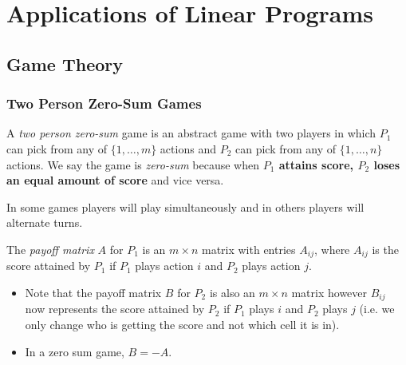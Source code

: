 \documentclass[../main.tex]{subfiles}
\begin{document}
\chapter{Applications of Linear Programs}
\section{Game Theory}
\subsection{Two Person Zero-Sum Games}
\begin{definition}
  A \textit{two person zero-sum} game is an abstract game with two players in which $P_1$ can pick from any of $\{1, \ldots, m\}$ actions and $P_2$ can pick from any of $\{1, \ldots, n\}$ actions.
  We say the game is \textit{zero-sum} because when \textbf{$P_1$ attains score, $P_2$ loses an equal amount of score} and vice versa.
\end{definition}
\begin{remark}[Note]
  In some games players will play simultaneously and in others players will alternate turns.
\end{remark}
\begin{definition}
  The \textit{payoff matrix} $A$ for $P_1$ is an $m \times n$ matrix with entries $A_{i j}$, where $A_{i j}$ is the score attained by $P_1$ if $P_1$ plays action $i$ and $P_2$ plays action $j$.
\end{definition}
\begin{remark}[Remarks]
  \begin{itemize}
    \item Note that the payoff matrix $B$ for $P_2$ is also an $m \times n$ matrix however $B_{i j}$ now represents the score attained by $P_2$  if $P_1$ plays $i$ and $P_2$ plays $j$ (i.e. we only change who is getting the score and not which cell it is in).
    \item In a zero sum game, $B = -A$.
  \end{itemize}
\end{remark}
\end{document}
